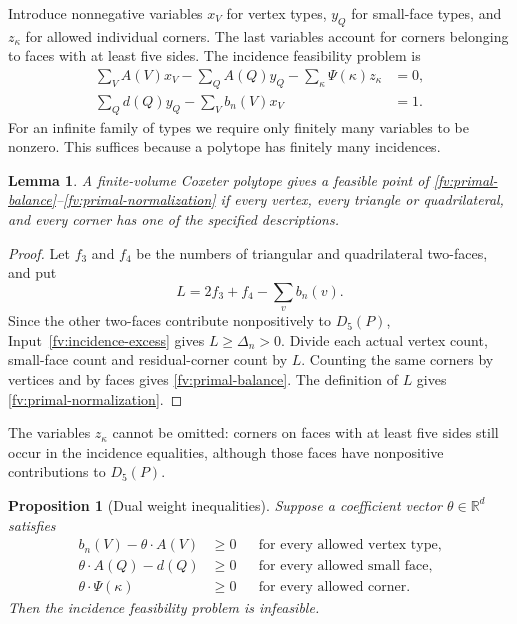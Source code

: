 \documentclass[11pt]{article}
\newtheorem{proposition}[theorem]{Proposition}
\newtheorem{lemma}[theorem]{Lemma}
\theoremstyle{definition}
\theoremstyle{remark}
\numberwithin{equation}{section}
\newcommand{\R}{\mathbb R}
\begin{document}
Introduce nonnegative variables $x_V$ for vertex types, $y_Q$ for
small-face types, and $z_\kappa$ for allowed individual corners. The
last variables account for corners belonging to faces with at least
five sides. The incidence feasibility problem is
\begin{align}
 \sum_VA(V)x_V-\sum_QA(Q)y_Q-
       \sum_\kappa\Psi(\kappa)z_\kappa&=0,
       \label{fv:primal-balance}\\
 \sum_Qd(Q)y_Q-\sum_Vb_n(V)x_V&=1.
       \label{fv:primal-normalization}
\end{align}
For an infinite family of types we require only finitely many
variables to be nonzero. This suffices because a polytope has finitely
many incidences.

\begin{lemma}\label{fv:actual-lift}
A finite-volume Coxeter polytope gives a feasible point of
\eqref{fv:primal-balance}--\eqref{fv:primal-normalization} if every
vertex, every triangle or quadrilateral, and every corner has one of
the specified descriptions.
\end{lemma}

\begin{proof}
Let $f_3$ and $f_4$ be the numbers of triangular and quadrilateral
two-faces, and put
\[
 L=2f_3+f_4-\sum_vb_n(v).
\]
Since the other two-faces contribute nonpositively to $D_5(P)$,
Input~\ref{fv:incidence-excess} gives
$L\ge\Delta_n>0$. Divide each actual vertex count, small-face count
and residual-corner count by $L$. Counting the same corners by vertices
and by faces gives \eqref{fv:primal-balance}. The definition of $L$
gives \eqref{fv:primal-normalization}.
\end{proof}

The variables $z_\kappa$ cannot be omitted: corners on faces with at
least five sides still occur in the incidence equalities, although
those faces have nonpositive contributions to $D_5(P)$.

\begin{proposition}[Dual weight inequalities]\label{fv:charge-certificate}
Suppose a coefficient vector $\theta\in\R^d$ satisfies
\begin{align}
 b_n(V)-\theta\cdot A(V)&\ge0 &&\text{for every allowed vertex type},
    \label{fv:vertex-certificate}\\
 \theta\cdot A(Q)-d(Q)&\ge0 &&\text{for every allowed small face},
    \label{fv:face-certificate}\\
 \theta\cdot\Psi(\kappa)&\ge0 &&\text{for every allowed corner}.
    \label{fv:corner-certificate}
\end{align}
Then the incidence feasibility problem is infeasible.
\end{proposition}
\end{document}
